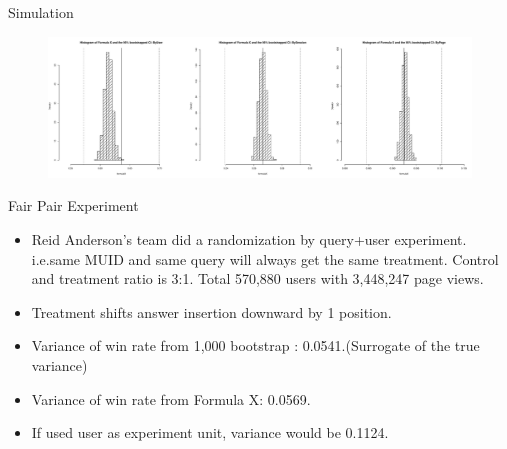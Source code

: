 \documentclass[xcolor=x11names,table]{beamer}
\begin{document}
  \begin{frame}{Simulation}
\begin{figure}[!htbp]
  \centering
  \includegraphics[width=1\textwidth]{jsm2}
\end{figure}
\end{frame}
 
  \begin{frame}{Fair Pair Experiment}
\begin{itemize}
\item  Reid Anderson's team did a randomization by query+user experiment. i.e.same MUID and same query will always get the same treatment. Control and treatment ratio is 3:1. Total 570,880 users with 3,448,247 page views.
\item Treatment  shifts answer insertion downward by 1 position.
\item Variance of win rate from 1,000 bootstrap : 0.0541.(Surrogate of the true variance)
\item Variance of win rate from Formula X: 0.0569.
\item If used user as experiment unit, variance would be 0.1124. 
\end{itemize}
\end{frame}
\end{document}

